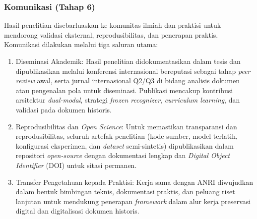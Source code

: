 \documentclass[12pt,a4paper]{article}
\begin{document}
\subsubsection{Komunikasi (Tahap 6)}
Hasil penelitian disebarluaskan ke komunitas ilmiah dan praktisi untuk mendorong validasi eksternal, reprodusibilitas, dan penerapan praktis. Komunikasi dilakukan melalui tiga saluran utama:

\begin{enumerate}[label=(\arabic*), nosep, leftmargin=0pt, itemindent=1.5em]
    \item Diseminasi Akademik: Hasil penelitian didokumentasikan dalam tesis dan dipublikasikan melalui konferensi internasional bereputasi sebagai tahap \textit{peer review} awal, serta jurnal internasional Q2/Q3 di bidang analisis dokumen atau pengenalan pola untuk diseminasi. Publikasi mencakup kontribusi arsitektur \textit{dual-modal}, strategi \textit{frozen recognizer}, \textit{curriculum learning}, dan validasi pada dokumen historis.
    
    \item Reprodusibilitas dan \textit{Open Science}: Untuk memastikan transparansi dan reprodusibilitas, seluruh artefak penelitian (kode sumber, model terlatih, konfigurasi eksperimen, dan \textit{dataset} semi-sintetis) dipublikasikan dalam repositori \textit{open-source} dengan dokumentasi lengkap dan \textit{Digital Object Identifier} (DOI) untuk sitasi permanen.
    
    \item Transfer Pengetahuan kepada Praktisi: Kerja sama dengan ANRI diwujudkan dalam bentuk bimbingan teknis, dokumentasi praktis, dan peluang riset lanjutan untuk mendukung penerapan \textit{framework} dalam alur kerja preservasi digital dan digitalisasi dokumen historis.
\end{enumerate}


% 


\end{document}
